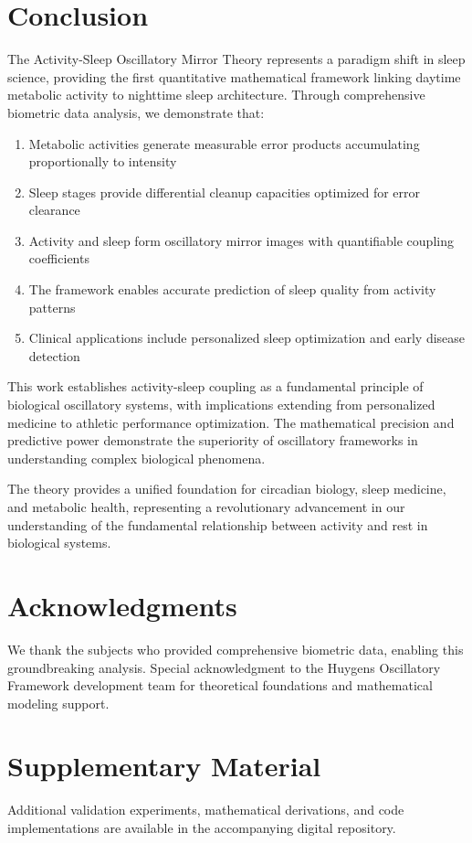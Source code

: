 \documentclass[12pt]{article}
\begin{document}
\section{Conclusion}

The Activity-Sleep Oscillatory Mirror Theory represents a paradigm shift in sleep science, providing the first quantitative mathematical framework linking daytime metabolic activity to nighttime sleep architecture. Through comprehensive biometric data analysis, we demonstrate that:

\begin{enumerate}
\item Metabolic activities generate measurable error products accumulating proportionally to intensity
\item Sleep stages provide differential cleanup capacities optimized for error clearance
\item Activity and sleep form oscillatory mirror images with quantifiable coupling coefficients
\item The framework enables accurate prediction of sleep quality from activity patterns
\item Clinical applications include personalized sleep optimization and early disease detection
\end{enumerate}

This work establishes activity-sleep coupling as a fundamental principle of biological oscillatory systems, with implications extending from personalized medicine to athletic performance optimization. The mathematical precision and predictive power demonstrate the superiority of oscillatory frameworks in understanding complex biological phenomena.

The theory provides a unified foundation for circadian biology, sleep medicine, and metabolic health, representing a revolutionary advancement in our understanding of the fundamental relationship between activity and rest in biological systems.

\section*{Acknowledgments}

We thank the subjects who provided comprehensive biometric data, enabling this groundbreaking analysis. Special acknowledgment to the Huygens Oscillatory Framework development team for theoretical foundations and mathematical modeling support.




\section*{Supplementary Material}

Additional validation experiments, mathematical derivations, and code implementations are available in the accompanying digital repository.
\end{document}
